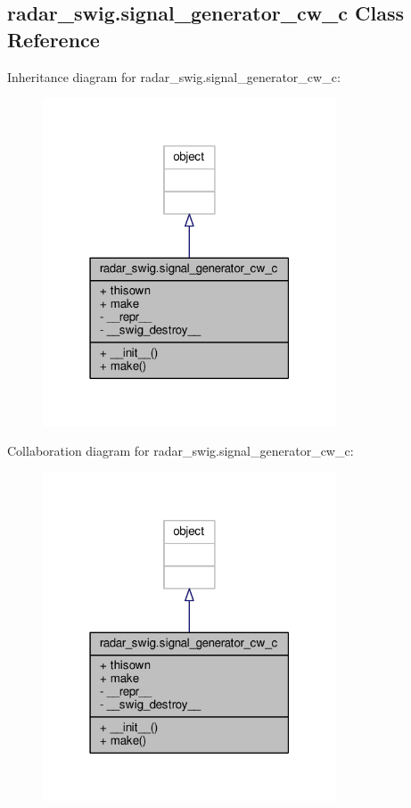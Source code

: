 \subsection{radar\+\_\+swig.\+signal\+\_\+generator\+\_\+cw\+\_\+c Class Reference}
\label{classradar__swig_1_1signal__generator__cw__c}


Inheritance diagram for radar\+\_\+swig.\+signal\+\_\+generator\+\_\+cw\+\_\+c\+:
\nopagebreak
\begin{figure}[H]
\begin{center}
\leavevmode
\includegraphics[width=247pt]{dc/d05/classradar__swig_1_1signal__generator__cw__c__inherit__graph}
\end{center}
\end{figure}


Collaboration diagram for radar\+\_\+swig.\+signal\+\_\+generator\+\_\+cw\+\_\+c\+:
\nopagebreak
\begin{figure}[H]
\begin{center}
\leavevmode
\includegraphics[width=247pt]{db/da7/classradar__swig_1_1signal__generator__cw__c__coll__graph}
\end{center}
\end{figure}
